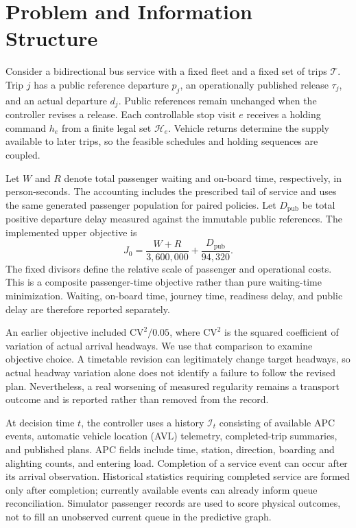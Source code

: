 \section{Problem and Information Structure}
\label{sec:problem}
Consider a bidirectional bus service with a fixed fleet and a fixed set of trips $\mathcal T$. Trip $j$ has a public reference departure $p_j$, an operationally published release $\tau_j$, and an actual departure $d_j$. Public references remain unchanged when the controller revises a release. Each controllable stop visit $e$ receives a holding command $h_e$ from a finite legal set $\mathcal H_e$. Vehicle returns determine the supply available to later trips, so the feasible schedules and holding sequences are coupled.

Let $W$ and $R$ denote total passenger waiting and on-board time, respectively, in person-seconds. The accounting includes the prescribed tail of service and uses the same generated passenger population for paired policies. Let $D_{\mathrm{pub}}$ be total positive departure delay measured against the immutable public references. The implemented upper objective is
\begin{equation}
 J_0=\frac{W+R}{3{,}600{,}000}+\frac{D_{\mathrm{pub}}}{94{,}320}.
 \label{eq:objective}
\end{equation}
The fixed divisors define the relative scale of passenger and operational costs. This is a composite passenger-time objective rather than pure waiting-time minimization. Waiting, on-board time, journey time, readiness delay, and public delay are therefore reported separately.

An earlier objective included $\mathrm{CV}^2/0.05$, where $\mathrm{CV}^2$ is the squared coefficient of variation of actual arrival headways. We use that comparison to examine objective choice. A timetable revision can legitimately change target headways, so actual headway variation alone does not identify a failure to follow the revised plan. Nevertheless, a real worsening of measured regularity remains a transport outcome and is reported rather than removed from the record.

At decision time $t$, the controller uses a history $\mathcal I_t$ consisting of available APC events, automatic vehicle location (AVL) telemetry, completed-trip summaries, and published plans. APC fields include time, station, direction, boarding and alighting counts, and entering load. Completion of a service event can occur after its arrival observation. Historical statistics requiring completed service are formed only after completion; currently available events can already inform queue reconciliation. Simulator passenger records are used to score physical outcomes, not to fill an unobserved current queue in the predictive graph.

